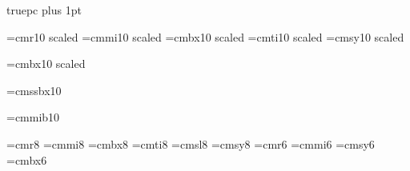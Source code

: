 

%

%
%
%
%



%
%
\hsize=31pc
 truepc
\hfuzz=2pt
\vfuzz=4pt
\parskip=0pt plus 1pt
\parindent=16pt
%


%
%
\font\fourteenrm=cmr10 scaled 
\font\fourteeni=cmmi10 scaled 
\font\fourteenbf=cmbx10 scaled 
\font\fourteenit=cmti10 scaled 
\font\fourteensy=cmsy10 scaled 

%
\font\large=cmbx10 scaled 

%
\font\sans=cmssbx10

%
\def\bss#1{\hbox{\sans #1}}

%
\font\bdi=cmmib10
\def\bi#1{\hbox{\bdi #1\/}}

%
\font\eightrm=cmr8
\font\eighti=cmmi8
\font\eightbf=cmbx8
\font\eightit=cmti8
\font\eightsl=cmsl8
\font\eightsy=cmsy8
\font\sixrm=cmr6
\font\sixi=cmmi6
\font\sixsy=cmsy6
\font\sixbf=cmbx6


